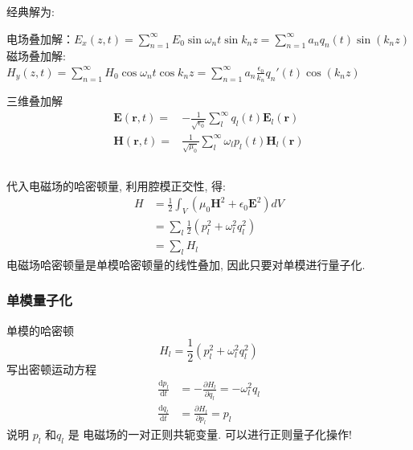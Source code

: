 \begin{frame}
      \frametitle{}
    经典解为:
      \begin{enumerate}
        \IItem 电场叠加解：$\displaystyle E_{x}(z,t) = \sum\limits_{n=1}^{\infty } E_{0}  \sin \omega_n t \sin k_n z= \sum\limits_{n=1}^{\infty } a_n q_n (t) \sin (k_n z)$
        \IItem 磁场叠加解: $\displaystyle H_{y}(z,t) = \sum\limits_{n=1}^{\infty } H_{0}  \cos \omega_n t \cos k_n z = \sum\limits_{n=1}^{\infty } a_n \frac{\epsilon_0}{k_n}q_n ' (t) \cos (k_n z)$  
    \end{enumerate}	
    三维叠加解
    \[ \begin{aligned}
    \mathbf{E}( \mathbf{r},t) =& - \frac{1}{\sqrt{ \epsilon_0}} \sum_l ^\infty   q_l(t) \mathbf{E}_l( \mathbf{r}) \\
    \mathbf{H}( \mathbf{r},t) =&  \frac{1}{\sqrt{ \mu_0}} \sum_l ^\infty  \omega_l p_l(t) \mathbf{H}_l( \mathbf{r}) \\
    \end{aligned} 
    \] 
\end{frame}

\begin{frame}
      \frametitle{}
    代入电磁场的哈密顿量, 利用腔模正交性, 得:
    \[ \begin{aligned}
        H &= \frac{1}{2} \int_V (\mu_0 \mathbf{H}^2 + \epsilon_0 \mathbf{E}^2) dV \\ 
        &= \sum_l  \frac{1}{2}(p_l ^2 + \omega_l ^2 q_l ^2 ) \\ 
        &= \sum_l H_l  
     \end{aligned} 
    \] 
    电磁场哈密顿量是单模哈密顿量的线性叠加, 因此只要对单模进行量子化.
\end{frame}

\begin{frame}
      \frametitle{单模量子化}
      单模的哈密顿
      \[ H_l  =  \frac{1}{2}(p_l ^2 + \omega_l ^2 q_l ^2 ) \]
      写出密顿运动方程
    \[ \begin{aligned}
        \frac{\mathrm{d}p_l}{\mathrm{d}t} &= - \frac{\partial H_l}{\partial q_l} = - \omega ^2 _l q_l \\ 
        \frac{\mathrm{d}q_l}{\mathrm{d}t} &= \frac{\partial H_l}{\partial p_l} =p_l
        \end{aligned} 
    \] 
    说明 $ p_l $ 和$q_l$ 是 电磁场的一对正则共轭变量.  可以进行正则量子化操作!
\end{frame}

